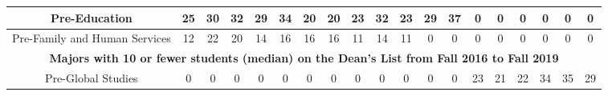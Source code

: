\documentclass[10]{article}
\begin{document}
\begin{landscape}
\begin{longtable}[c]{|ccccccccccccccccccc|}
	\multicolumn{1}{|c|}{Pre-Education}                              & \multicolumn{1}{c|}{25}         & \multicolumn{1}{c|}{30}         & \multicolumn{1}{c|}{32}         & \multicolumn{1}{c|}{29}         & \multicolumn{1}{c|}{34}         & \multicolumn{1}{c|}{20}         & \multicolumn{1}{c|}{20}         & \multicolumn{1}{c|}{23}         & \multicolumn{1}{c|}{32}         & \multicolumn{1}{c|}{23}         & \multicolumn{1}{c|}{29}         & \multicolumn{1}{c|}{37}         & \multicolumn{1}{c|}{0}          & \multicolumn{1}{c|}{0}          & \multicolumn{1}{c|}{0}          & \multicolumn{1}{c|}{0}          & \multicolumn{1}{c|}{0}          & 0          \\ \hline
	\multicolumn{1}{|c|}{Pre-Family and Human Services}              & \multicolumn{1}{c|}{12}         & \multicolumn{1}{c|}{22}         & \multicolumn{1}{c|}{20}         & \multicolumn{1}{c|}{14}         & \multicolumn{1}{c|}{16}         & \multicolumn{1}{c|}{16}         & \multicolumn{1}{c|}{16}         & \multicolumn{1}{c|}{11}         & \multicolumn{1}{c|}{14}         & \multicolumn{1}{c|}{11}         & \multicolumn{1}{c|}{0}          & \multicolumn{1}{c|}{0}          & \multicolumn{1}{c|}{0}          & \multicolumn{1}{c|}{0}          & \multicolumn{1}{c|}{0}          & \multicolumn{1}{c|}{0}          & \multicolumn{1}{c|}{0}          & 0          \\ \hline
	\multicolumn{19}{|c|}{\textbf{Majors with 10 or fewer students (median) on the Dean's List from Fall 2016 to Fall 2019}}                                                                                                                                                                                                                                                                                                                                                                                                                                                                                                                                                        \\ \hline
	\multicolumn{1}{|c|}{Pre-Global Studies}                         & \multicolumn{1}{c|}{0}          & \multicolumn{1}{c|}{0}          & \multicolumn{1}{c|}{0}          & \multicolumn{1}{c|}{0}          & \multicolumn{1}{c|}{0}          & \multicolumn{1}{c|}{0}          & \multicolumn{1}{c|}{0}          & \multicolumn{1}{c|}{0}          & \multicolumn{1}{c|}{0}          & \multicolumn{1}{c|}{0}          & \multicolumn{1}{c|}{0}          & \multicolumn{1}{c|}{0}          & \multicolumn{1}{c|}{23}         & \multicolumn{1}{c|}{21}         & \multicolumn{1}{c|}{22}         & \multicolumn{1}{c|}{34}         & \multicolumn{1}{c|}{35}         & 29         \\ \hline

\end{longtable}
\end{landscape}
\end{document}
